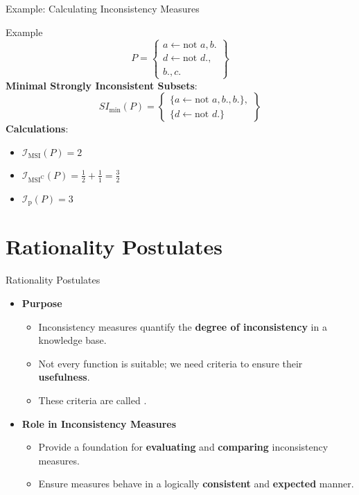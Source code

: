 \begin{frame}{Example: Calculating Inconsistency Measures}
    \begin{exampleblock}{Example}
        \[
            P = \left\{ \begin{array}{l}
                a \leftarrow \text{not }a, b. \\
                d \leftarrow \text{not }d.,   \\
                b., c.
            \end{array} \right\}
        \]
        \textbf{Minimal Strongly Inconsistent Subsets}:
        \[
            SI_{\min}(P) = \left\{ \begin{array}{l}
                \{ a \leftarrow \text{not }a, b., b.\}, \\
                \{ d \leftarrow \text{not }d. \}
            \end{array} \right\}
        \]
        \textbf{Calculations}:
        \begin{itemize}
            \item \( \mathcal{I}_{\text{MSI}}(P) = 2 \)
            \item \( \mathcal{I}_{\text{MSI}^\text{C}}(P) = \frac{1}{2} + \frac{1}{1} = \frac{3}{2} \)
            \item \( \mathcal{I}_{\text{p}}(P) = 3 \)
        \end{itemize}
    \end{exampleblock}
\end{frame}

\section{Rationality Postulates}

\begin{frame}{Rationality Postulates}
    \begin{itemize}
        \item \textbf{Purpose}
              \begin{itemize}
                  \item Inconsistency measures quantify the \textbf{degree of inconsistency} in a knowledge base.
                  \item Not every function is suitable; we need criteria to ensure their \textbf{usefulness}.
                  \item These criteria are called .
              \end{itemize}
        \item \textbf{Role in Inconsistency Measures}
              \begin{itemize}
                  \item Provide a foundation for \textbf{evaluating} and \textbf{comparing} inconsistency measures.
                  \item Ensure measures behave in a logically \textbf{consistent} and \textbf{expected} manner.
              \end{itemize}
    \end{itemize}
\end{frame}

